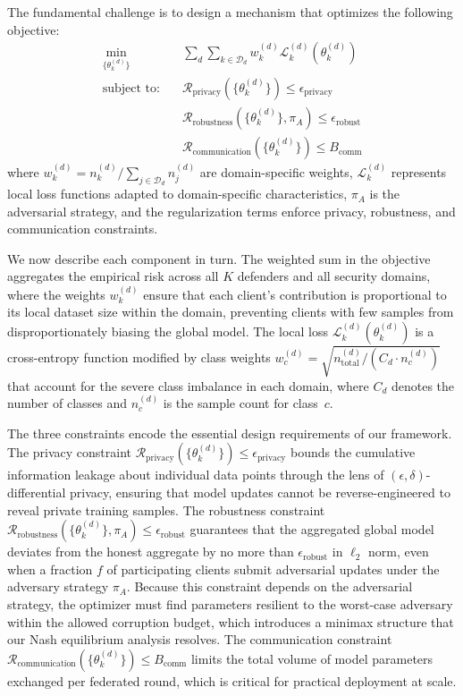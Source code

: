\documentclass[12pt,a4paper]{article}
\newcommand{\rev}[1]{\textcolor{revcolor}{#1}}
\theoremstyle{definition}
\newcommand{\D}{\mathcal{D}}
\begin{document}
The fundamental challenge is to design a mechanism that optimizes the following objective:
\begin{align}
\min_{\{\theta_k^{(d)}\}} \quad & \sum_{d} \sum_{k \in \D_d} w_k^{(d)} \mathcal{L}_k^{(d)}(\theta_k^{(d)}) \label{eq:main_objective}\\
\text{subject to:} \quad & \mathcal{R}_{\text{privacy}}(\{\theta_k^{(d)}\}) \leq \epsilon_{\text{privacy}} \nonumber \\
& \mathcal{R}_{\text{robustness}}(\{\theta_k^{(d)}\}, \pi_A) \leq \epsilon_{\text{robust}} \nonumber \\
& \mathcal{R}_{\text{communication}}(\{\theta_k^{(d)}\}) \leq B_{\text{comm}} \nonumber
\end{align}
where $w_k^{(d)} = n_k^{(d)}/\sum_{j \in \D_d} n_j^{(d)}$ are domain-specific weights, $\mathcal{L}_k^{(d)}$ represents local loss functions adapted to domain-specific characteristics, $\pi_A$ is the adversarial strategy, and the regularization terms enforce privacy, robustness, and communication constraints.

\rev{We now describe each component in turn. The weighted sum in the objective aggregates the empirical risk across all $K$ defenders and all security domains, where the weights $w_k^{(d)}$ ensure that each client's contribution is proportional to its local dataset size within the domain, preventing clients with few samples from disproportionately biasing the global model. The local loss $\mathcal{L}_k^{(d)}(\theta_k^{(d)})$ is a cross-entropy function modified by class weights $w_c^{(d)} = \sqrt{n_{\text{total}}^{(d)} / (C_d \cdot n_c^{(d)})}$ that account for the severe class imbalance in each domain, where $C_d$ denotes the number of classes and $n_c^{(d)}$ is the sample count for class~$c$.}

\rev{The three constraints encode the essential design requirements of our framework. The privacy constraint $\mathcal{R}_{\text{privacy}}(\{\theta_k^{(d)}\}) \leq \epsilon_{\text{privacy}}$ bounds the cumulative information leakage about individual data points through the lens of $(\epsilon,\delta)$-differential privacy, ensuring that model updates cannot be reverse-engineered to reveal private training samples. The robustness constraint $\mathcal{R}_{\text{robustness}}(\{\theta_k^{(d)}\}, \pi_A) \leq \epsilon_{\text{robust}}$ guarantees that the aggregated global model deviates from the honest aggregate by no more than $\epsilon_{\text{robust}}$ in $\ell_2$ norm, even when a fraction $f$ of participating clients submit adversarial updates under the adversary strategy $\pi_A$. Because this constraint depends on the adversarial strategy, the optimizer must find parameters resilient to the worst-case adversary within the allowed corruption budget, which introduces a minimax structure that our Nash equilibrium analysis resolves. The communication constraint $\mathcal{R}_{\text{communication}}(\{\theta_k^{(d)}\}) \leq B_{\text{comm}}$ limits the total volume of model parameters exchanged per federated round, which is critical for practical deployment at scale.}
\end{document}

